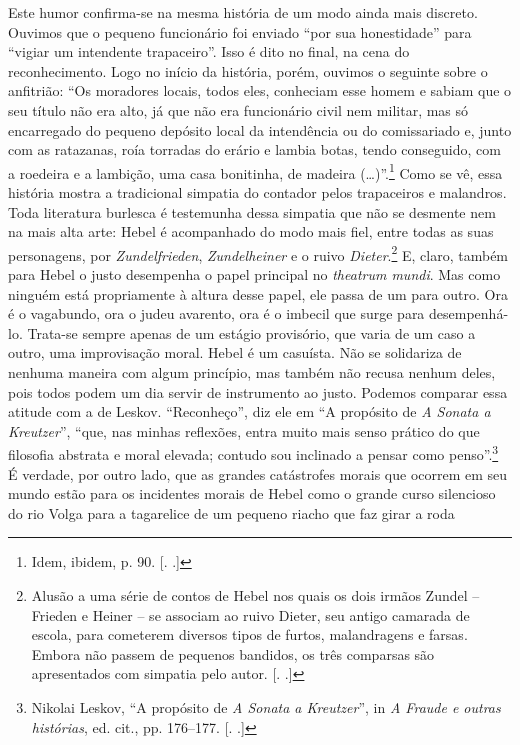 Este humor confirma-se na mesma história de um modo ainda mais discreto.
Ouvimos que o pequeno funcionário foi enviado ``por sua honestidade''
para ``vigiar um intendente trapaceiro''. Isso é dito no final, na cena
do reconhecimento. Logo no início da história, porém, ouvimos o seguinte
sobre o anfitrião: ``Os moradores locais, todos eles, conheciam esse
homem e sabiam que o seu título não era alto, já que não era funcionário
civil nem militar, mas só encarregado do pequeno depósito local da
intendência ou do comissariado e, junto com as ratazanas, roía torradas
do erário e lambia botas, tendo conseguido, com a roedeira e a lambição,
uma casa bonitinha, de madeira (\ldots{})''.\footnote{Idem, ibidem, p. 90.
  [. .]} Como se vê, essa história mostra a tradicional
simpatia do contador pelos trapaceiros e malandros. Toda literatura
burlesca é testemunha dessa simpatia que não se desmente nem na mais
alta arte: Hebel é acompanhado do modo mais fiel, entre todas as suas
personagens, por \emph{Zundelfrieden}, \emph{Zundelheiner} e o ruivo
\emph{Dieter}.\footnote{Alusão a uma série de contos de Hebel nos quais
  os dois irmãos Zundel -- Frieden e Heiner -- se associam ao ruivo
  Dieter, seu antigo camarada de escola, para cometerem diversos tipos
  de furtos, malandragens e farsas. Embora não passem de pequenos
  bandidos, os três comparsas são apresentados com simpatia pelo autor.
  [. .]} E, claro, também para Hebel o justo desempenha o papel
principal no \emph{theatrum mundi}. Mas como ninguém está propriamente à
altura desse papel, ele passa de um para outro. Ora é o vagabundo, ora o
judeu avarento, ora é o imbecil que surge para desempenhá-lo. Trata-se
sempre apenas de um estágio provisório, que varia de um caso a outro,
uma improvisação moral. Hebel é um casuísta. Não se solidariza de
nenhuma maneira com algum princípio, mas também não recusa nenhum deles,
pois todos podem um dia servir de instrumento ao justo. Podemos comparar
essa atitude com a de Leskov. ``Reconheço'', diz ele em ``A propósito de
\emph{A Sonata a Kreutzer}'', ``que, nas minhas reflexões, entra muito
mais senso prático do que filosofia abstrata e moral elevada; contudo
sou inclinado a pensar como penso''.\footnote{Nikolai Leskov, ``A
  propósito de \emph{A Sonata a Kreutzer}'', in \emph{A Fraude e outras
  histórias}, ed. cit., pp. 176--177. [. .]} É verdade, por
outro lado, que as grandes catástrofes morais que ocorrem em seu mundo
estão para os incidentes morais de Hebel como o grande curso silencioso
do rio Volga para a tagarelice de um pequeno riacho que faz girar a roda
